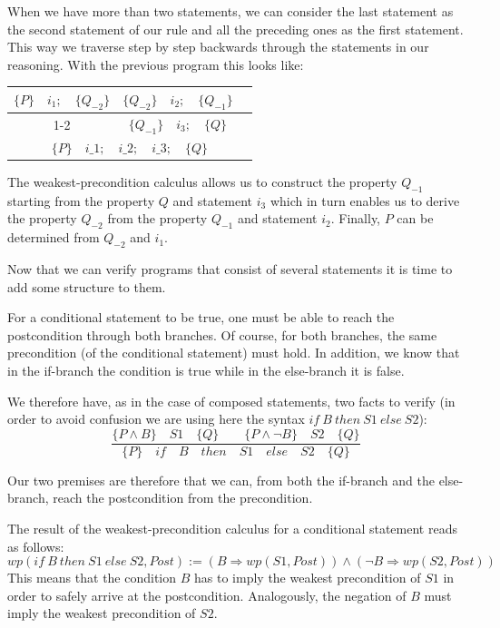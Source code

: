 

When we have more than two statements, we can consider the last
statement as the second statement of our rule and all the preceding ones as
the first statement. This way we traverse step by step backwards through the
statements in our reasoning. With the previous program this looks like:


\begin{center}
\begin{tabular}{ccc}
  $\{P\}\quad i_1 ; \quad \{Q_{-2}\}$ & $\{Q_{-2}\}\quad i_2 ; \quad \{Q_{-1}\}$ & \\
  \cline{1-2}
  \multicolumn{2}{c}{$\{P\}\quad i\_1 ; \quad i\_2 ; \quad \{Q_{-1}\}$} & $\{Q_{-1}\} \quad i_3 ; \quad \{Q\}$\\
  \hline
  \multicolumn{3}{c}{$\{P\}\quad i\_1 ; \quad i\_2 ; \quad i\_3; \quad \{ Q \}$}
\end{tabular}
\end{center}

The weakest-precondition calculus allows us to construct the property
$Q_{-1}$ starting from the property $Q$ and statement $i_3$ which
in turn enables us to derive the property $Q_{-2}$ from the property
$Q_{-1}$ and statement $i_2$. Finally, $P$ can be determined from
$Q_{-2}$ and $i_1$.



Now that we can verify programs that consist of several statements it
is time to add some structure to them.





For a conditional statement to be true, one must be able to reach the
postcondition through both branches. Of course, for both branches, the
same precondition (of the conditional statement) must hold. In addition,
we know that in the if-branch the condition is true while in the
else-branch it is false.

We therefore have, as in the case of composed statements, two facts to
verify (in order to avoid confusion we are using here the syntax
$if\ B\ then\ S1\ else\ S2$):
$$\dfrac{\{P \wedge B\}\quad S1\quad \{Q\} \quad \quad \{P \wedge \neg B\}\quad S2\quad \{Q\}}{\{P\}\quad if\quad B\quad then\quad S1\quad else\quad S2 \quad \{Q\}}$$

Our two premises are therefore that we can, from both the if-branch and the
else-branch, reach the postcondition from the precondition.

The result of the weakest-precondition calculus for a conditional
statement reads as follows:
$$wp(if\ B\ then\ S1\ else\ S2 , Post) := (B \Rightarrow wp(S1, Post)) \wedge (\neg B \Rightarrow wp(S2, Post))$$
This means that the condition $B$ has to imply the weakest
precondition of $S1$ in order to safely arrive at the postcondition.
Analogously, the negation of $B$ must imply the weakest precondition
of $S2$.



